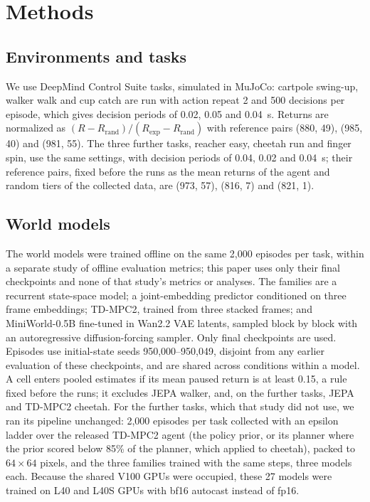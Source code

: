 \documentclass[aps,physrev,\manuscriptlayout,superscriptaddress,
  longbibliography,amsmath,amssymb]{revtex4-2}
\begin{document}
\section{Methods}\label{sec:methods}

\subsection{Environments and tasks}\label{sec:envs}

We use DeepMind Control Suite tasks\cite{tassa2018dmc}, simulated in MuJoCo\cite{todorov2012mujoco}: cartpole swing-up, walker walk and cup catch are run with action repeat 2 and 500 decisions per episode, which gives decision periods of 0.02, 0.05 and 0.04~s. Returns are normalized as $(R-R_{\mathrm{rand}})/(R_{\mathrm{exp}}-R_{\mathrm{rand}})$ with reference pairs (880, 49), (985, 40) and (981, 55). The three further tasks, reacher easy, cheetah run and finger spin, use the same settings, with decision periods of 0.04, 0.02 and 0.04~s; their reference pairs, fixed before the runs as the mean returns of the agent and random tiers of the collected data, are (973, 57), (816, 7) and (821, 1).

\subsection{World models}\label{sec:models}

The world models were trained offline on the same 2,000 episodes per task\cite{xia2026rch}, within a separate study of offline evaluation metrics; this paper uses only their final checkpoints and none of that study's metrics or analyses. The families are a recurrent state-space model\cite{hafner2019planet}; a joint-embedding predictor conditioned on three frame embeddings\cite{maes2026lewm}; TD-MPC2\cite{hansen2023tdmpc2}, trained from three stacked frames; and MiniWorld-0.5B\cite{zhao2026miniworld} fine-tuned in Wan2.2 VAE latents\cite{wan2025}, sampled block by block with an autoregressive diffusion-forcing sampler\cite{chen2024diffusionforcing}. Only final checkpoints are used. Episodes use initial-state seeds 950,000--950,049, disjoint from any earlier evaluation of these checkpoints, and are shared across conditions within a model. A cell enters pooled estimates if its mean paused return is at least 0.15, a rule fixed before the runs; it excludes JEPA walker, and, on the further tasks, JEPA and TD-MPC2 cheetah. For the further tasks, which that study did not use, we ran its pipeline unchanged: 2,000 episodes per task collected with an epsilon ladder over the released TD-MPC2 agent (the policy prior, or its planner where the prior scored below 85\% of the planner, which applied to cheetah), packed to $64\times64$ pixels, and the three families trained with the same steps, three models each. Because the shared V100 GPUs were occupied, these 27 models were trained on L40 and L40S GPUs with bf16 autocast instead of fp16.
\end{document}
